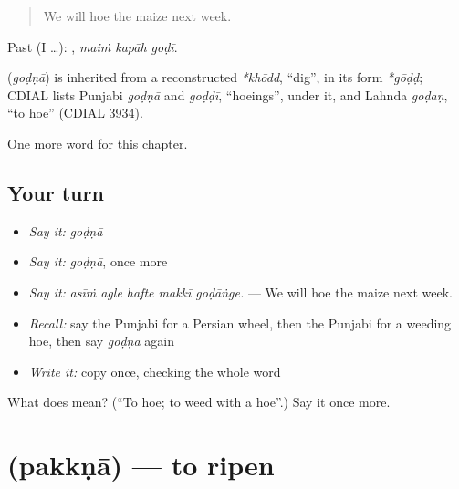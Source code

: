\begin{quote}
We will hoe the maize next week.
\end{quote}

Past (I …):   , \emph{maiṁ kapāh goḍī}.

\begin{cousinweb}
\textbf{} (\emph{goḍṇā}) is inherited from a reconstructed \emph{*khōdd}, \textquotedblleft{}dig\textquotedblright{}, in its form \emph{*gōḍḍ}; CDIAL lists Punjabi \emph{goḍṇā} and \emph{goḍḍī}, \textquotedblleft{}hoeings\textquotedblright{}, under it, and Lahnda \emph{goḍaṇ}, \textquotedblleft{}to hoe\textquotedblright{} (CDIAL 3934).
\end{cousinweb}

\begin{grammarlens}[title={What you've built}]
One more word for this chapter.
\end{grammarlens}

\subsection*{Your turn}
\begin{itemize}
\raggedright
  \item \emph{Say it:} \emph{goḍṇā}
  \item \emph{Say it:} \emph{goḍṇā}, once more
  \item \emph{Say it:} \emph{asīṁ agle hafte makkī goḍāṅge.} — We will hoe the maize next week.
  \item \emph{Recall:} say the Punjabi for a Persian wheel, then the Punjabi for a weeding hoe, then say \emph{goḍṇā} again
  \item \emph{Write it:} copy \textbf{} once, checking the whole word
\end{itemize}

\begin{tcolorbox}[breakable,colback=teal!4,colframe=teal!35!black,title={Before you move on}]
What does  mean? (\textquotedblleft{}To hoe; to weed with a hoe\textquotedblright{}.) Say it once more.
\end{tcolorbox}
\section[\texorpdfstring{\pa{ਪੱਕਣਾ} (pakkṇā)}{ਪੱਕਣਾ (pakkṇā)}]{ (pakkṇā) — to ripen}

\label{lesson:PA-C304-pakkna}




